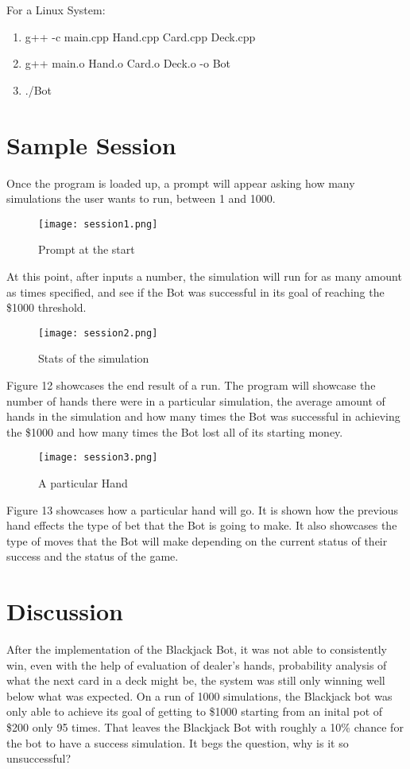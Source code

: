 {{{{For a Linux System:
\begin{enumerate}
	\item g++ -c main.cpp Hand.cpp Card.cpp Deck.cpp
	\item g++ main.o Hand.o Card.o Deck.o -o Bot
	\item ./Bot
\end{enumerate}

\newpage
\section{Sample Session}
Once the program is loaded up, a prompt will appear asking how many simulations the user wants to run, between 1 and 1000. 
\begin{figure}[H]
	\centering
	\texttt{[image: session1.png]}\\
	\caption{Prompt at the start}
	\label{fig:tobias}
\end{figure}

At this point, after inputs a number, the simulation will run for as many amount as times specified, and see if the Bot was successful in its goal of reaching the \$1000 threshold. 
 \begin{figure}[H]
	\centering
	\texttt{[image: session2.png]}\\
	\caption{Stats of the simulation}
	\label{fig:tobias}
\end{figure}

Figure 12 showcases the end result of a run. The program will showcase the number of hands there were in a particular simulation, the average amount of hands in the simulation and how many times the Bot was successful in achieving the \$1000 and how many times the Bot lost all of its starting money.

 \begin{figure}[H]
	\centering
	\texttt{[image: session3.png]}\\
	\caption{A particular Hand}
	\label{fig:tobias}
\end{figure}

Figure 13 showcases how a particular hand will go. It is shown how the previous hand effects the type of bet that the Bot is going to make. It also showcases the type of moves that the Bot will make depending on the current status of their success and the status of the game. 

\section{Discussion}
After the implementation of the Blackjack Bot, it was not able to consistently win, even with the help of evaluation of dealer's hands, probability analysis of what the next card in a deck might be, the system was still only winning well below what was expected. On a run of 1000 simulations, the Blackjack bot was only able to achieve its goal of getting to \$1000 starting from an inital pot of \$200 only 95 times. That leaves the Blackjack Bot with roughly a 10\% chance for the bot to have a success simulation. It begs the question, why is it so unsuccessful? 
\newline
{\setlength{\parindent}{0cm}

}}}}}
